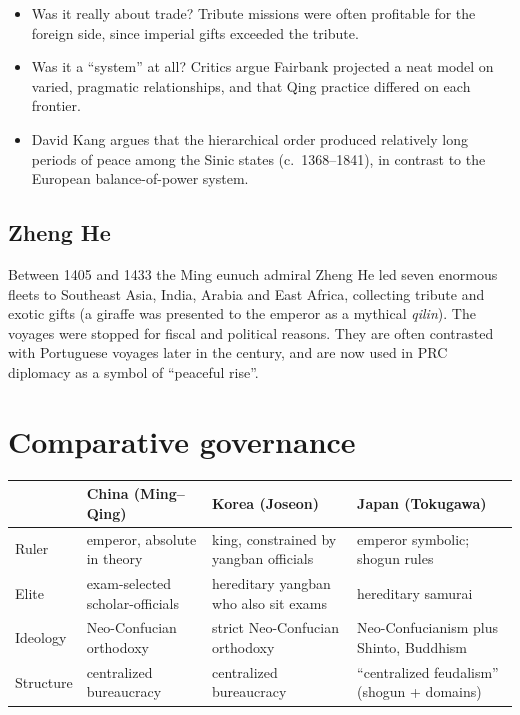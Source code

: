\begin{important}[Debates]
\begin{itemize}
  \item Was it really about trade? Tribute missions were often profitable for the
        foreign side, since imperial gifts exceeded the tribute.
  \item Was it a ``system'' at all? Critics argue Fairbank projected a neat model on
        varied, pragmatic relationships, and that Qing practice differed on each frontier.
  \item David Kang argues that the hierarchical order produced relatively long periods of
        peace among the Sinic states (c.\ 1368--1841), in contrast to the European
        balance-of-power system.
\end{itemize}
\end{important}

\subsection{Zheng He}

Between 1405 and 1433 the Ming eunuch admiral Zheng He led seven enormous fleets to
Southeast Asia, India, Arabia and East Africa, collecting tribute and exotic gifts (a
giraffe was presented to the emperor as a mythical \emph{qilin}). The voyages were stopped
for fiscal and political reasons. They are often contrasted with Portuguese voyages later
in the century, and are now used in PRC diplomacy as a symbol of ``peaceful rise''.

\section{Comparative governance}

\begin{center}
\begin{tabular}{lp{3.6cm}p{3.6cm}p{3.6cm}}
\toprule
 & China (Ming--Qing) & Korea (Joseon) & Japan (Tokugawa) \\
\midrule
Ruler & emperor, absolute in theory & king, constrained by yangban officials & emperor symbolic; shogun rules \\
Elite & exam-selected scholar-officials & hereditary yangban who also sit exams & hereditary samurai \\
Ideology & Neo-Confucian orthodoxy & strict Neo-Confucian orthodoxy & Neo-Confucianism plus Shinto, Buddhism \\
Structure & centralized bureaucracy & centralized bureaucracy & ``centralized feudalism'' (shogun + domains) \\
\bottomrule
\end{tabular}
\end{center}

